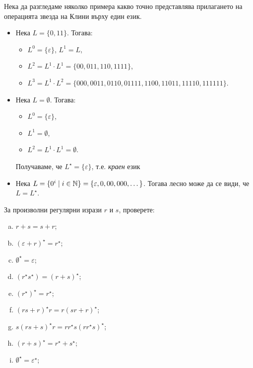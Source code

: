 \begin{example}
  Нека да разгледаме няколко примера какво точно представлява прилагането
  на операцията звезда на Клини върху един език.
  \begin{itemize}
  \item 
    Нека $L = \{0,11\}$. Тогава:
    \begin{itemize}
    \item 
      $L^0 = \{\varepsilon\}$, $L^1 = L$,
    \item
      $L^2 = L^1\cdot L^1 = \{00,011,110,1111\}$,
    \item
      $L^3 = L^1\cdot L^2 = \{000,0011,0110,01111,1100,11011,11110,111111\}$.
    \end{itemize}
  \item
    Нека $L = \emptyset$.
    Тогава:
    \begin{itemize}
    \item 
      $L^0 = \{\varepsilon\}$,
    \item
      $L^1 = \emptyset$,
    \item
      $L^2 = L^1 \cdot L^1 = \emptyset$.
    \end{itemize}    
    Получаваме, че $L^\star = \{\varepsilon\}$, т.е. {\em краен} език
  \item
    Нека $L = \{0^i\mid i \in \mathbb{N}\} = \{\varepsilon, 0, 00, 000, \dots\}$.
    Тогава лесно може да се види, че $L = L^\star$.
  \end{itemize}
\end{example}

\begin{problem}
  За произволни регулярни изрази $r$ и $s$, 
  проверете:
  \begin{enumerate}[a)]
  \item 
    $r+s = s + r$;
  \item
    $(\varepsilon + r)^\star = r^\star$;
  \item
    $\emptyset^\star = \varepsilon$;
  \item
    $(r^\star s^\star) = (r+s)^\star$;
  \item
    $(r^\star)^\star = r^\star$;
  \item
    $(rs + r)^\star r = r(sr+r)^\star$;
  \item
    $s(rs+s)^\star r = rr^\star s(rr^\star s)^\star$;
  \item
    $(r+s)^\star = r^\star + s^\star$;
  \item
    $\emptyset^\star = \varepsilon^\star$;
  \end{enumerate}
\end{problem}

